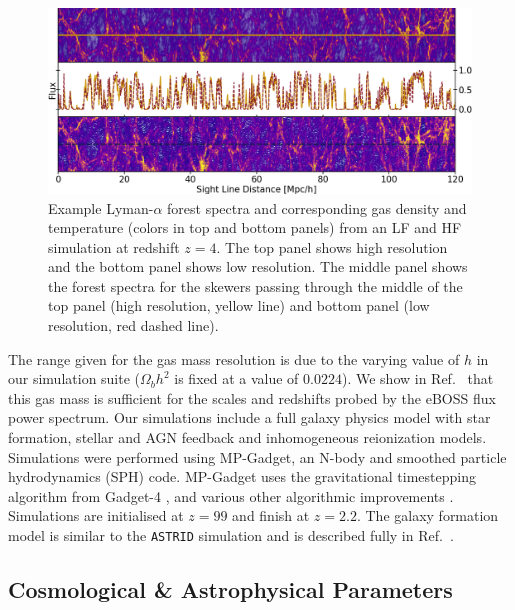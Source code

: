 \begin{figure}
    \centering
    \includegraphics[width=\columnwidth]{figures/spectra_temp_simulation.png}
    \caption{\label{fig:spec_sim}
    Example Lyman-$\alpha$ forest spectra and corresponding gas density and temperature (colors in top and bottom panels) from an LF and HF simulation at redshift $z=4$.
    The top panel shows high resolution and the bottom panel shows low resolution.
    The middle panel shows the \lya forest spectra for the skewers passing through the middle of the top panel (high resolution, yellow line) and bottom panel (low resolution, red dashed line).
    }
\end{figure}

The range given for the gas mass resolution is due to the varying value of $h$ in our simulation suite ($\Omega_b h^2$ is fixed at a value of $0.0224$).
We show in Ref.~\cite{2023simsuite} that this gas mass is sufficient for the scales and redshifts probed by the eBOSS flux power spectrum.
Our simulations include a full galaxy physics model with star formation, stellar and AGN feedback and inhomogeneous reionization models.
Simulations were performed using MP-Gadget\footnotemark, an N-body and smoothed particle hydrodynamics (SPH) code.
MP-Gadget uses the gravitational timestepping algorithm from Gadget-4 \cite{Springel:2021}, and various other algorithmic improvements \cite{2020JCAP...06..002B}.
Simulations are initialised at $z=99$ and finish at $z=2.2$. The galaxy formation model is similar to the \texttt{ASTRID} simulation \cite{2022MNRAS.512.3703B, 2022MNRAS.513..670N} and is described fully in Ref.~\cite{2023simsuite}.


\subsection{Cosmological \& Astrophysical Parameters}\label{sec:parameters}

